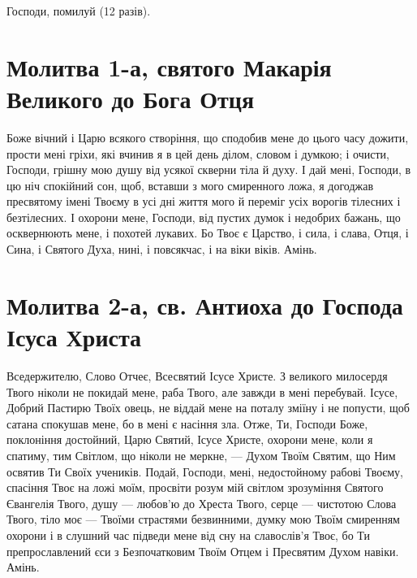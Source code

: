 \documentclass[chapters.tex]{subfiles}
\begin{document}
Господи, помилуй (12 разів).

\section{Молитва 1-а, святого Макарія Великого до Бога Отця}
Боже вічний і Царю всякого створіння, що сподобив мене до цього часу дожити, прости мені гріхи, які вчинив я в цей день ділом, словом і думкою; і очисти, Господи, грішну мою душу від усякої скверни тіла й духу. І дай мені, Господи, в цю ніч спокійний сон, щоб, вставши з мого смиренного ложа, я догоджав пресвятому імені Твоєму в усі дні життя мого й переміг усіх ворогів тілесних і безтілесних. І охорони мене, Господи, від пустих думок і недобрих бажань, що осквернюють мене, і похотей лукавих. Бо Твоє є Царство, і сила, і слава, Отця, і Сина, і Святого Духа, нині, і повсякчас, і на віки віків. Амінь.

\section{Молитва 2-а, св. Антиоха до Господа Ісуса Христа}
Вседержителю, Слово Отчеє, Всесвятий Ісусе Христе. З великого милосердя Твого ніколи не покидай мене, раба Твого, але завжди в мені перебувай. Ісусе, Добрий Пастирю Твоїх овець, не віддай мене на поталу зміїну і не попусти, щоб сатана спокушав мене, бо в мені є насіння зла. Отже, Ти, Господи Боже, поклоніння достойний, Царю Святий, Ісусе Христе, охорони мене, коли я спатиму, тим Світлом, що ніколи не меркне, — Духом Твоїм Святим, що Ним освятив Ти Своїх учеників. Подай, Господи, мені, недостойному рабові Твоєму, спасіння Твоє на ложі моїм, просвіти розум мій світлом зрозуміння Святого Євангелія Твого, душу — любов’ю до Хреста Твого, серце — чистотою Слова Твого, тіло моє — Твоїми страстями безвинними, думку мою Твоїм смиренням охорони і в слушний час підведи мене від сну на славослів’я Твоє, бо Ти препрославлений єси з Безпочатковим Твоїм Отцем і Пресвятим Духом навіки. Амінь.
\end{document}
